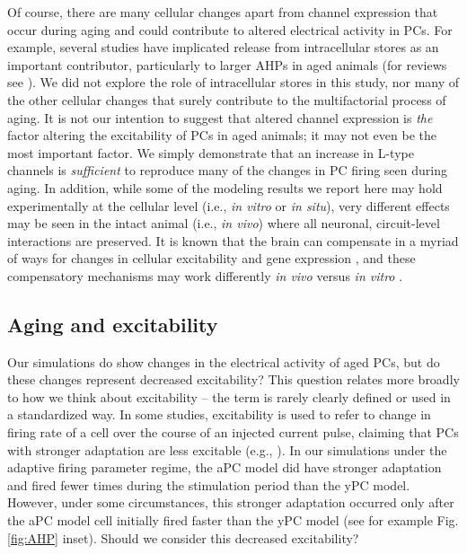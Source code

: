 \documentclass[12pt]{article}
\begin{document}
Of course, there are many cellular changes apart from {\Ca} channel expression that occur during aging and could contribute to altered electrical activity in PCs. For example, several studies have implicated {\Ca} release from intracellular stores as an important contributor, particularly to larger AHPs in aged animals \citep{gant2006early,bodhinathan2010redox}
(for reviews see \citep{thibault2007expansion,toescu2010calcium}). We did not explore the role of intracellular {\Ca} stores in this study, nor many of the other cellular changes that surely contribute to the multifactorial process of aging. It is not our intention to suggest that altered {\Ca} channel expression is \textit{the} factor altering the excitability of PCs in aged animals; it may not even be the most important factor. We simply demonstrate that an increase in L-type {\Ca} channels is \textit{sufficient} to reproduce many of the changes in PC firing seen during aging. In addition, while some of the modeling results we report here may hold experimentally at the cellular level (i.e., \textit{in vitro} or \textit{in situ}), very different effects may be seen in the intact animal (i.e., \textit{in vivo}) where all neuronal, circuit-level interactions are preserved. It is known that the brain can compensate in a myriad of ways for changes in cellular excitability and gene expression \cite{grashow2010compensation,kim2017nonreciprocal}, and these compensatory mechanisms may work differently \textit{in vivo} versus \textit{in vitro} \cite{echegoyen2007homeostatic,morgan2019kv1}.

\subsection{Aging and excitability}
 Our simulations do show changes in the electrical activity of aged PCs, but do these changes represent decreased excitability? This question relates more broadly to how we think about excitability -- the term is rarely clearly defined or used in a standardized way. In some studies, excitability is used to refer to change in firing rate of a cell over the course of an injected current pulse, claiming that PCs with stronger adaptation are less excitable (e.g., \cite{moyer1992nimodipine,oh1999metrifonate}). In our simulations under the adaptive firing parameter regime, the aPC model did have stronger adaptation and fired fewer times during the stimulation period than the yPC model. However, under some circumstances, this stronger adaptation occurred only after the aPC model cell initially fired faster than the yPC model (see for example Fig. \ref{fig:AHP} inset). Should we consider this decreased excitability? 
 
\end{document}
